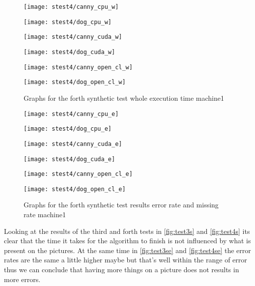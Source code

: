 \begin{figure}[H]
\centering
\begin{minipage}[t]{.49\textwidth}
\centering
\texttt{[image: stest4/canny\_cpu\_w]}
\end{minipage}
\begin{minipage}[t]{.49\textwidth}
\centering
\texttt{[image: stest4/dog\_cpu\_w]}
\end{minipage}
\begin{minipage}[t]{.49\textwidth}
\centering
\texttt{[image: stest4/canny\_cuda\_w]}
\end{minipage}
\begin{minipage}[t]{.49\textwidth}
\centering
\texttt{[image: stest4/dog\_cuda\_w]}
\end{minipage}
\begin{minipage}[t]{.49\textwidth}
\centering
\texttt{[image: stest4/canny\_open\_cl\_w]}
\end{minipage}
\begin{minipage}[t]{.49\textwidth}
\centering
\texttt{[image: stest4/dog\_open\_cl\_w]}
\end{minipage}
\caption{Graphs for the forth synthetic test whole execution time machine1}
\label{fig:tes4sw}
\end{figure}

\begin{figure}[H]
\centering
\begin{minipage}[t]{.49\textwidth}
\centering
\texttt{[image: stest4/canny\_cpu\_e]}
\end{minipage}
\begin{minipage}[t]{.49\textwidth}
\centering
\texttt{[image: stest4/dog\_cpu\_e]}
\end{minipage}
\begin{minipage}[t]{.49\textwidth}
\centering
\texttt{[image: stest4/canny\_cuda\_e]}
\end{minipage}
\begin{minipage}[t]{.49\textwidth}
\centering
\texttt{[image: stest4/dog\_cuda\_e]}
\end{minipage}
\begin{minipage}[t]{.49\textwidth}
\centering
\texttt{[image: stest4/canny\_open\_cl\_e]}
\end{minipage}
\begin{minipage}[t]{.49\textwidth}
\centering
\texttt{[image: stest4/dog\_open\_cl\_e]}
\end{minipage}
\caption{Graphs for the forth synthetic test results error rate and missing rate machine1}
\label{fig:test4se}
\end{figure}

Looking at the results of the third and forth tests in \autoref{fig:test3s} and \autoref{fig:test4s} its clear that the time it takes for the algorithm to finish is not influenced by what is present on the pictures.
At the same time in \autoref{fig:test3se} and \autoref{fig:test4se} the error rates are the same a little higher maybe but that's well within the range of error thus we can conclude that having more things on a picture does not results in more errors.